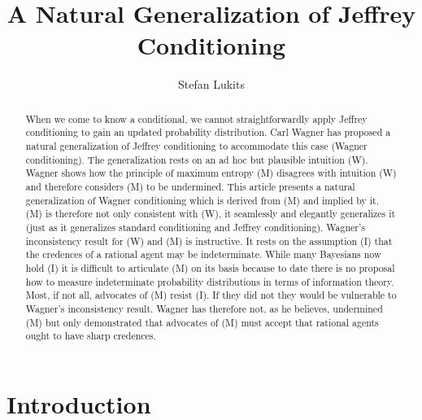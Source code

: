 \documentclass[11pt]{article}
\begin{document}

\title{A Natural Generalization of Jeffrey Conditioning}
\author{Stefan Lukits}


\date{}



\begin{abstract} 
  {\noindent}When we come to know a conditional, we cannot
  straightforwardly apply Jeffrey conditioning to gain an updated
  probability distribution. Carl Wagner has proposed a natural
  generalization of Jeffrey conditioning to accommodate this case
  (Wagner conditioning). The generalization rests on an ad hoc but
  plausible intuition (W). Wagner shows how the principle of maximum
  entropy (M) disagrees with intuition (W) and therefore considers (M)
  to be undermined. This article presents a natural generalization of
  Wagner conditioning which is derived from (M) and implied by it. (M)
  is therefore not only consistent with (W), it seamlessly and
  elegantly generalizes it (just as it generalizes standard
  conditioning and Jeffrey conditioning). Wagner's inconsistency
  result for (W) and (M) is instructive. It rests on the assumption
  (I) that the credences of a rational agent may be indeterminate.
  While many Bayesians now hold (I) it is difficult to articulate (M)
  on its basis because to date there is no proposal how to measure
  indeterminate probability distributions in terms of information
  theory. Most, if not all, advocates of (M) resist (I). If they did
  not they would be vulnerable to Wagner's inconsistency result.
  Wagner has therefore not, as he believes, undermined (M) but only
  demonstrated that advocates of (M) must accept that rational agents
  ought to have sharp credences.
\end{abstract}

\section{Introduction}
\label{Introduction}

\end{document}
